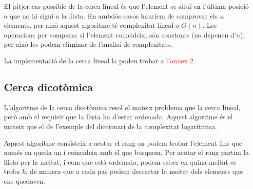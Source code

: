 El pitjor cas possible de la cerca lineal és que l'element se situï en l'última posició o que no hi sigui a la llista. En ambdós casos hauríem de comprovar els $n$ elements, per això aquest algoritme té complexitat lineal o $O(n)$. Les operacions per comparar si l'element coincideix, són constants (no depenen d'$n$), per això les podem eliminar de l'analisi de complexitats.

La implementació de la cerca lineal la podeu trobar a \textcolor{red}{l'annex 2.}

\subsection{Cerca dicotòmica}
L'algoritme de la cerca dicotòmica resol el mateix problema que la cerca lineal, però amb el requisit que la llista ha d'estar ordenada. Aquest algoritme és el mateix que el de l'exemple del diccionari de la complexitat logarítmica. 

Aquest algoritme consisteix a acotar el rang on podem trobar l'element fins que només en queda un i coincideix amb el que busquem. Per acotar el rang partim la llista per la meitat, i com que està ordenada, podem saber en quina meitat es troba $k$, de manera que a cada pas podem descartar la meitat dels elements que ens quedaven.



